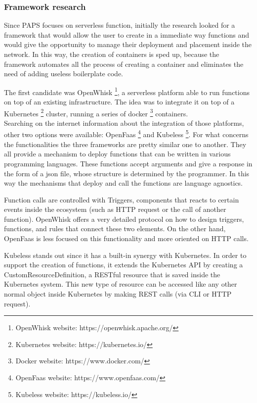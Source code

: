 \subsubsection*{Framework research}


Since PAPS focuses on serverless function, initially the research looked for a framework 
that would allow the user to create in a immediate way functions and would give the opportunity to manage their
deployment and placement inside the network.
In this way, the creation of containers is sped up, because the framework automates all the process
of creating a container and eliminates the need of adding useless boilerplate code.
\par
The first candidate was OpenWhisk \footnote{OpenWhisk website: https://openwhisk.apache.org/}, a serverless platform able to run 
functions on top of an existing infrastructure. The idea was to integrate it on top of a Kubernetes \footnote{Kubernetes website: https://kubernetes.io/} 
cluster, running a series of docker \footnote{Docker website: https://www.docker.com/} containers. \\
Searching on the internet information about the integration of those platforms, other two 
options were available: OpenFaas \footnote{OpenFaas website: https://www.openfaas.com/} and 
Kubeless \footnote{Kubeless website: https://kubeless.io/}. For what concerns 
the functionalities the three frameworks are pretty similar one to another.
They all provide a mechanism to deploy functions that can be written in various programming languages.
These functions accept arguments and give a response in the form of a json file, whose structure
is determined by the programmer. In this way the mechanisms that deploy and call the functions are language agnostics.
\par
Function calls are controlled with Triggers, components that reacts to certain events inside the 
ecosystem (such as HTTP request or the call of another function).
OpenWhisk offers a very detailed protocol on how to design triggers, functions, and rules
that connect these two elements.
On the other hand, OpenFaas is less focused on this functionality and more oriented on HTTP calls.
\par
Kubeless stands out since it has a built-in synergy with Kubernetes. In order to support the creation of functions, 
it extends the Kubernetes API by creating a CustomResourceDefinition, a RESTful resource that is saved inside the Kubernetes
system. This new type of resource can be accessed like any other normal object inside Kubernetes
by making REST calls (via CLI or HTTP request).

